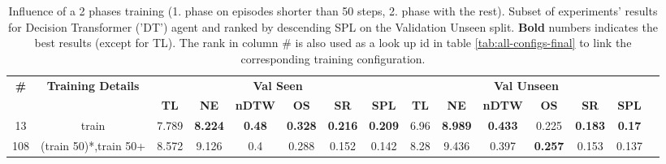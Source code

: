 \begin{table}
\centering
\caption{\label{tab:dt_split_training_50}Influence of a 2 phases training (1. phase on episodes shorter than 50 steps, 2. phase with the rest). Subset of experiments' results for Decision Transformer ('DT') agent and ranked by descending SPL on the Validation Unseen split. \textbf{Bold} numbers indicates the best results (except for TL). The rank in column \# is also used as a look up id in table \ref{tab:all-configs-final} to link the corresponding training configuration.}
\begin{tabular}{@{\hskip3pt}c@{\hskip3pt}c@{\hskip3pt}c@{\hskip3pt}c@{\hskip3pt}c@{\hskip3pt}c@{\hskip3pt}c@{\hskip3pt}c@{\hskip3pt}c@{\hskip3pt}c@{\hskip3pt}c@{\hskip3pt}c@{\hskip3pt}c@{\hskip3pt}c@{\hskip3pt}c}
\toprule
                                  \textbf{\#} & \textbf{Training Details} & \multicolumn{6}{c}{\textbf{Val Seen}} & \multicolumn{6}{c}{\textbf{Val Unseen}} \\
\cmidrule(l){3-8}\cmidrule(l){9-14}\textbf{~} &                \textbf{~} &       \textbf{TL} &     \textbf{NE} &  \textbf{nDTW} &     \textbf{OS} &     \textbf{SR} &    \textbf{SPL} &         \textbf{TL} &     \textbf{NE} &   \textbf{nDTW} &     \textbf{OS} &     \textbf{SR} &   \textbf{SPL} \\
\midrule
                                           13 &                     train &             7.789 &  \textbf{8.224} &  \textbf{0.48} &  \textbf{0.328} &  \textbf{0.216} &  \textbf{0.209} &                6.96 &  \textbf{8.989} &  \textbf{0.433} &           0.225 &  \textbf{0.183} &  \textbf{0.17} \\
                                          108 &     (train 50)*,train 50+ &             8.572 &           9.126 &            0.4 &           0.288 &           0.152 &           0.142 &                8.28 &           9.436 &           0.397 &  \textbf{0.257} &           0.153 &          0.137 \\
\bottomrule
\end{tabular}
\end{table}
